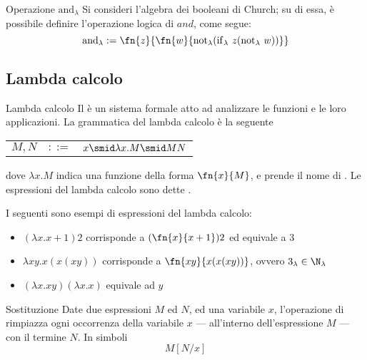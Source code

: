 \documentclass[a4paper, 12pt]{report}
\begin{document}
    \begin{framedprop}{Operazione $\mathrm{and}_\lambda$}
        Si consideri l'algebra dei booleani di Church; su di essa, è possibile definire l'operazione logica di $and$, come segue: $$\mathrm{and}_\lambda := \fn{z}{\fn{w}{\mathrm{not}_\lambda(\mathrm{if}_\lambda \ z (\mathrm{not}_\lambda \ w))}}$$
    \end{framedprop}

    \subsection{Lambda calcolo}

    \begin{frameddefn}{Lambda calcolo}
        Il  è un sistema formale atto ad analizzare le funzioni e le loro applicazioni. La grammatica del lambda calcolo è la seguente
        \begin{center}
            \begin{tabular}{rcl}
                $M, N$ & $::=$ & $x \smid \lambda x . M \smid MN$ \\
            \end{tabular}
        \end{center}

        dove $\lambda x.M$ indica una funzione della forma $\fn{x}{M}$, e prende il nome di . Le espressioni del lambda calcolo sono dette .
    \end{frameddefn}

    \begin{example}
        I seguenti sono esempi di espressioni del lambda calcolo:

        \begin{itemize}
            \item $(\lambda x.x +1)2$ corrisponde a $(\fn{x}{x+1})2$ ed equivale a 3
            \item $\lambda xy.x(x(xy))$ corrisponde a $\fn{xy}{x(x(xy))}$, ovvero $3_\lambda \in \N_\lambda$
            \item $(\lambda x.xy)(\lambda x.x)$ equivale ad $y$
        \end{itemize}
    \end{example}

    \begin{frameddefn}[label={sub}]{Sostituzione}
        Date due espressioni $M$ ed $N$, ed una variabile $x$, l'operazione di  rimpiazza ogni occorrenza della variabile $x$ --- all'interno dell'espressione $M$ --- con il termine $N$. In simboli $$M[N/x]$$ 
    \end{frameddefn}
\end{document}
